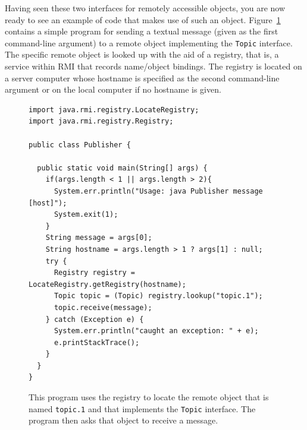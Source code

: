 Having seen these two interfaces for remotely accessible objects, you
are now ready to see an example of code that makes use of such an
object.  Figure~\ref{Publisher-source} contains a simple program for
sending a textual message (given as the first command-line argument)
to a remote object implementing the {\tt Topic} interface.  The
specific remote object is looked up with the aid of a registry, that is, a service
within RMI that records name/object bindings.  The registry is
located on a server computer whose hostname is specified as the second
command-line argument or on the local computer if no hostname is given.
\begin{figure}
\begin{verbatim}
import java.rmi.registry.LocateRegistry;
import java.rmi.registry.Registry;

public class Publisher {

  public static void main(String[] args) {
    if(args.length < 1 || args.length > 2){
      System.err.println("Usage: java Publisher message [host]");
      System.exit(1);
    }
    String message = args[0];
    String hostname = args.length > 1 ? args[1] : null;
    try {
      Registry registry = LocateRegistry.getRegistry(hostname);
      Topic topic = (Topic) registry.lookup("topic.1");
      topic.receive(message);
    } catch (Exception e) {
      System.err.println("caught an exception: " + e);
      e.printStackTrace();
    }
  }
}
\end{verbatim}
\caption{This program uses the registry to locate the remote object
  that is named {\tt topic.1} and that
  implements the {\tt Topic} interface.  The program then asks that
  object to receive a message.}\label{Publisher-source}
\end{figure}

